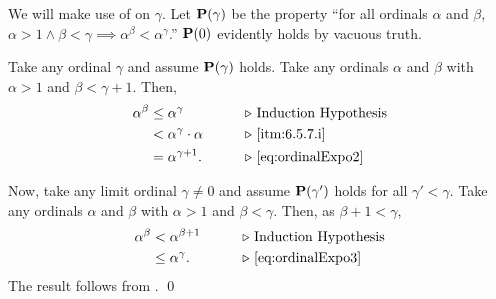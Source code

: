 \documentclass[../introduction_to_set_theory_Note.tex]{subfiles}
\begin{document}
{\begin{enumerate}[nolistsep, label=(\roman*), leftmargin=*, listparindent=\parindent]
    \ii
    We will make use of  on \(\gamma\).
    Let \(\bm{\mathrm{P}}(\gamma)\) be the property
    ``for all ordinals \(\alpha\) and \(\beta\),
    \(\alpha > 1 \land \beta < \gamma \implies \alpha^\beta < \alpha^\gamma\).''
    \(\bm{\mathrm{P}}(0)\) evidently holds by vacuous truth.

    Take any ordinal \(\gamma\) and assume \(\bm{\mathrm{P}}(\gamma)\) holds.
    Take any ordinals \(\alpha\) and \(\beta\)
    with \(\alpha > 1\) and \(\beta < \gamma + 1\). Then,
    \begin{alignat*}{2}
        \alpha^\beta
        &\le \alpha^\gamma &\qquad& \comment*{Induction Hypothesis} \\
        &< \alpha^\gamma \cdot \alpha && \comment*{\ref{itm:6.5.7.i}} \\
        &= \alpha^{\gamma + 1}. && \comment*{\eqref{eq:ordinalExpo2}}
    \end{alignat*}

    Now, take any limit ordinal \(\gamma \neq 0\)
    and assume \(\bm{\mathrm{P}}(\gamma')\) holds for all \(\gamma' < \gamma\).
    Take any ordinals \(\alpha\) and \(\beta\)
    with \(\alpha > 1\) and \(\beta < \gamma\). Then, as \(\beta + 1 < \gamma\),
    \begin{alignat*}{2}
        \alpha^\beta
        &< \alpha^{\beta+1} &\qquad& \comment*{Induction Hypothesis} \\
        &\le \alpha^\gamma. && \comment*{\eqref{eq:ordinalExpo3}}
    \end{alignat*}
    The result follows from .
    \qed
\end{enumerate}
}
\end{document}
